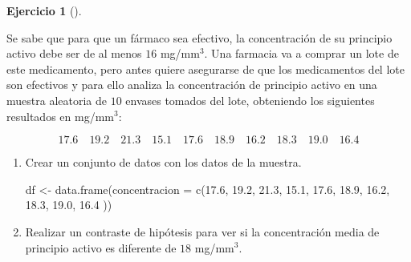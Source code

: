 \documentclass[
  a4paper,
]{scrreport}
\newenvironment{Shaded}{\begin{snugshade}}{\end{snugshade}}
\newcommand{\AttributeTok}[1]{\textcolor[rgb]{0.40,0.45,0.13}{#1}}
\newcommand{\FloatTok}[1]{\textcolor[rgb]{0.68,0.00,0.00}{#1}}
\newcommand{\FunctionTok}[1]{\textcolor[rgb]{0.28,0.35,0.67}{#1}}
\newcommand{\NormalTok}[1]{\textcolor[rgb]{0.00,0.23,0.31}{#1}}
\newcommand{\OtherTok}[1]{\textcolor[rgb]{0.00,0.23,0.31}{#1}}
\theoremstyle{definition}
\newtheorem{exercise}{Ejercicio}[chapter]
\theoremstyle{remark}
\begin{document}
\begin{exercise}[]\protect\hypertarget{exr-contraste-hipotesis-media-principio-activo}{}\label{exr-contraste-hipotesis-media-principio-activo}

Se sabe que para que un fármaco sea efectivo, la concentración de su
principio activo debe ser de al menos \(16\) mg/mm\(^3\). Una farmacia
va a comprar un lote de este medicamento, pero antes quiere asegurarse
de que los medicamentos del lote son efectivos y para ello analiza la
concentración de principio activo en una muestra aleatoria de \(10\)
envases tomados del lote, obteniendo los siguientes resultados en
mg/mm\(^{3}\):

\[
17.6 \quad 19.2 \quad 21.3 \quad 15.1 \quad 17.6 \quad 18.9 \quad 16.2 \quad 18.3 \quad 19.0 \quad 16.4
\]

\begin{enumerate}
\def\labelenumi{\alph{enumi}.}
\item
  Crear un conjunto de datos con los datos de la muestra.

  \begin{tcolorbox}[enhanced jigsaw, breakable, toptitle=1mm, colbacktitle=quarto-callout-tip-color!10!white, rightrule=.15mm, opacityback=0, opacitybacktitle=0.6, titlerule=0mm, coltitle=black, colframe=quarto-callout-tip-color-frame, colback=white, bottomtitle=1mm, leftrule=.75mm, toprule=.15mm, title=\textcolor{quarto-callout-tip-color}{\faLightbulb}\hspace{0.5em}{Solución}, arc=.35mm, bottomrule=.15mm, left=2mm]

\begin{Shaded}
\begin{Highlighting}[]
\NormalTok{df }\OtherTok{\textless{}{-}} \FunctionTok{data.frame}\NormalTok{(}\AttributeTok{concentracion =} \FunctionTok{c}\NormalTok{(}\FloatTok{17.6}\NormalTok{, }\FloatTok{19.2}\NormalTok{, }\FloatTok{21.3}\NormalTok{, }\FloatTok{15.1}\NormalTok{, }\FloatTok{17.6}\NormalTok{, }\FloatTok{18.9}\NormalTok{, }\FloatTok{16.2}\NormalTok{, }\FloatTok{18.3}\NormalTok{, }\FloatTok{19.0}\NormalTok{, }\FloatTok{16.4}\NormalTok{ ))}
\end{Highlighting}
\end{Shaded}

  \end{tcolorbox}
\item
  Realizar un contraste de hipótesis para ver si la concentración media
  de principio activo es diferente de \(18\) mg/mm\(^3\).

  \begin{tcolorbox}[enhanced jigsaw, breakable, toptitle=1mm, colbacktitle=quarto-callout-note-color!10!white, rightrule=.15mm, opacityback=0, opacitybacktitle=0.6, titlerule=0mm, coltitle=black, colframe=quarto-callout-note-color-frame, colback=white, bottomtitle=1mm, leftrule=.75mm, toprule=.15mm, title=\textcolor{quarto-callout-note-color}{\faInfo}\hspace{0.5em}{Ayuda}, arc=.35mm, bottomrule=.15mm, left=2mm]


\end{tcolorbox}
\end{enumerate}
\end{exercise}
\end{document}
